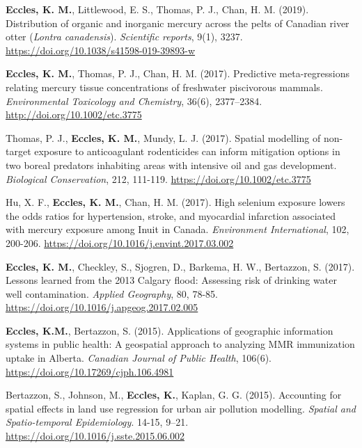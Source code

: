 \documentclass[margin,line]{res}
\begin{document}
\begin{resume}
\begin{etaremune}[start=26]
\item \textbf{Eccles, K. M.}, Littlewood, E. S., Thomas, P. J., Chan, H. M. (2019). Distribution of organic and inorganic mercury across the pelts of Canadian river otter (\textit{Lontra canadensis}). \textit{Scientific reports}, 9(1), 3237. \url{https://doi.org/10.1038/s41598-019-39893-w}

\item \textbf{Eccles, K. M.}, Thomas, P. J., Chan, H. M. (2017). Predictive meta-regressions relating mercury tissue concentrations of freshwater piscivorous mammals. \textit{Environmental Toxicology and Chemistry}, 36(6), 2377–2384. \url{http://doi.org/10.1002/etc.3775}

\item Thomas, P. J., \textbf{Eccles, K. M.}, Mundy, L. J. (2017). Spatial modelling of non-target exposure to anticoagulant rodenticides can inform mitigation options in two boreal predators inhabiting areas with intensive oil and gas development. \textit{Biological Conservation}, 212, 111-119. \url{https://doi.org/10.1002/etc.3775}

\item Hu, X. F., \textbf{Eccles, K. M.}, Chan, H. M. (2017). High selenium exposure lowers the odds ratios for hypertension, stroke, and myocardial infarction associated with mercury exposure among Inuit in Canada. \textit{Environment International}, 102, 200-206. \url{https://doi.org/10.1016/j.envint.2017.03.002}

\item \textbf{Eccles, K. M.}, Checkley, S., Sjogren, D., Barkema, H. W., Bertazzon, S. (2017). Lessons learned from the 2013 Calgary flood: Assessing risk of drinking water well contamination. \textit{Applied Geography}, 80, 78-85. \url{https://doi.org/10.1016/j.apgeog.2017.02.005}

\item \textbf{Eccles, K.M.}, Bertazzon, S. (2015). Applications of geographic information systems in public health: A geospatial approach to analyzing MMR immunization uptake in Alberta. \textit{Canadian Journal of Public Health}, 106(6). \url{https://doi.org/10.17269/cjph.106.4981}

\item Bertazzon, S., Johnson, M., \textbf{Eccles, K.}, Kaplan, G. G. (2015). Accounting for spatial effects in land use regression for urban air pollution modelling. \textit{Spatial and Spatio-temporal Epidemiology}. 14-15, 9–21. \url{https://doi.org/10.1016/j.sste.2015.06.002}


\end{etaremune}
\end{resume}
\end{document}
